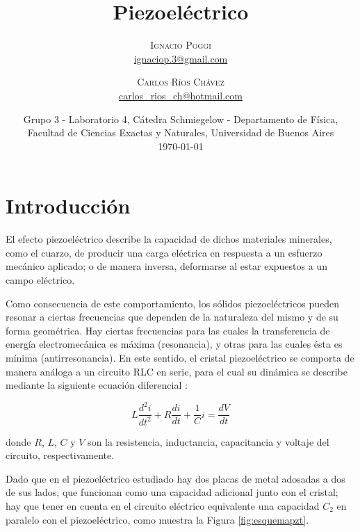 \documentclass[twoside,twocolumn,a4paper]{article}
\title{Piezoel\'ectrico} %
\author{%
\textsc{Ignacio Poggi} \\[1ex] %
\normalsize \href{mailto:ignaciop.3@gmail.com}{ignaciop.3@gmail.com} %
\and %
\textsc{Carlos R\'ios Ch\'avez} \\[1ex] %
\normalsize \href{mailto:carlos_rios_ch@hotmail.com}{carlos\_rios\_ch@hotmail.com} %
}
\date{Grupo 3 - Laboratorio 4, C\'atedra Schmiegelow - Departamento de F\'isica, Facultad de Ciencias Exactas y Naturales, Universidad de Buenos Aires \newline \\ \today} %
\begin{document}
\maketitle



\section{Introducci\'on}



El efecto piezoel\'ectrico describe la capacidad de dichos materiales minerales, como el cuarzo, de producir una carga el\'ectrica en respuesta a un esfuerzo mec\'anico aplicado; o de manera inversa, deformarse al estar expuestos a un campo el\'ectrico. \newline

\par
Como consecuencia de este comportamiento, los s\'olidos piezoel\'ectricos pueden resonar a ciertas frecuencias que dependen de la naturaleza del mismo y de su forma geom\'etrica. Hay ciertas frecuencias para las cuales la transferencia de energ\'ia electromec\'anica es m\'axima (resonancia), y otras para las cuales \'esta es m\'inima (antirresonancia). En este sentido, el cristal piezoel\'ectrico se comporta de manera an\'aloga a un circuito RLC en serie, para el cual su din\'amica se describe mediante la siguiente ecuaci\'on diferencial \cite{eq:oderlc}:

\begin{equation}
\label{eq:oderlc}
L\frac{d^{2}i}{dt^{2}} + R\frac{di}{dt} + \frac{1}{C}i = \frac{dV}{dt}
\end{equation}

donde $R$, $L$, $C$ y $V$ son la resistencia, inductancia, capacitancia y voltaje del circuito, respectivamente. \newline


\par
Dado que en el piezoel\'ectrico estudiado hay dos placas de metal adosadas a dos de sus lados, que funcionan como una capacidad adicional junto con el cristal; hay que tener en cuenta en el circuito el\'ectrico equivalente una capacidad $C_{2}$ en paralelo con el piezoel\'ectrico, como muestra la Figura \ref{fig:esquemapzt}.
\end{document}
